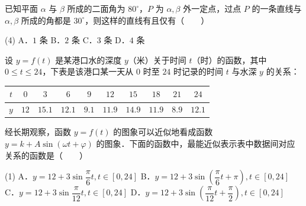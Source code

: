 \begin{question}
已知平面 $\alpha$ 与 $\beta$ 所成的二面角为 $80^\circ$，$P$ 为 $\alpha, \beta$ 外一定点，过点 $P$ 的一条直线与 $\alpha, \beta$ 所成的角都是 $30^\circ$，则这样的直线有且仅有\mbox{（　　）}

\begin{gkopts}(4)
\task A．$1$ 条
\task B．$2$ 条
\task C．$3$ 条
\task D．$4$ 条
\end{gkopts}

\end{question}
\begin{question}
设 $y = f(t)$ 是某港口水的深度 $y$（米）关于时间 $t$（时）的函数，其中 $0 \leqslant t \leqslant 24$，下表是该港口某一天从 $0$ 时至 $24$ 时记录的时间 $t$ 与水深 $y$ 的关系：

\begin{center}
\begingroup\setlength{\tabcolsep}{4pt}
\begin{tabular}{cccccccccc}
\toprule
$t$ & $0$ & $3$ & $6$ & $9$ & $12$ & $15$ & $18$ & $21$ & $24$ \\
\midrule
$y$ & $12$ & $15.1$ & $12.1$ & $9.1$ & $11.9$ & $14.9$ & $11.9$ & $8.9$ & $12.1$ \\
\bottomrule
\end{tabular}
\endgroup
\end{center}

经长期观察，函数 $y = f(t)$ 的图象可以近似地看成函数 $y = k + A\sin(\omega t + \varphi)$ 的图象．下面的函数中，最能近似表示表中数据间对应关系的函数是\mbox{（　　）}

\begin{gkopts}(1)
\task A．$y = 12 + 3\sin\dfrac{\pi}{6}t, t \in [0, 24]$
\task B．$y = 12 + 3\sin\left(\dfrac{\pi}{6}t + \pi\right), t \in [0, 24]$
\task C．$y = 12 + 3\sin\dfrac{\pi}{12}t, t \in [0, 24]$
\task D．$y = 12 + 3\sin\left(\dfrac{\pi}{12}t + \dfrac{\pi}{2}\right), t \in [0, 24]$
\end{gkopts}

\end{question}

